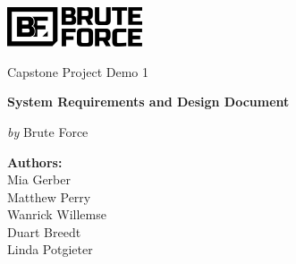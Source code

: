 \documentclass[12pt,a4paper]{article}
\begin{document}
   \begin{titlepage}
      {\selectfont
      	\centering
      	\includegraphics[width=0.30\textwidth]{Bids/logo.png}\par\vspace{1cm}
      	{\LARGE Capstone Project Demo 1 \par}
      	\vspace{0.25cm}
      	{\huge\bfseries \color{cyan}System Requirements and Design Document\par}
      	\vspace{1cm}
      	{\Large\textit{by} Brute Force\par}
         \vspace{0.25cm}

         \par\vspace{1cm}
         \date{}
         \author{}
         \title{}
         \centering
         \textbf{Authors:}\\
         Mia Gerber\\
         Matthew Perry\\
         Wanrick Willemse\\
         Duart Breedt\\
         Linda Potgieter\\
      }
   \end{titlepage}
   \maketitle
   \tableofcontents
   \newpage
\end{document}
